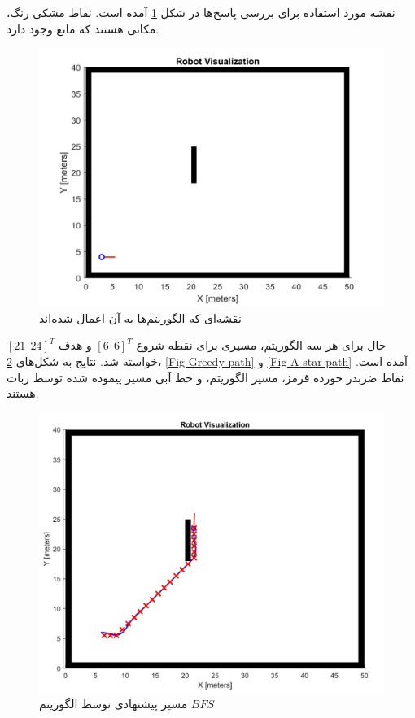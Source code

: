 نقشه مورد استفاده برای بررسی پاسخ‌ها در شکل \ref{Fig mapRooz} آمده است. نقاط مشکی رنگ، مکانی هستند که مانع وجود دارد.
\begin{figure}[!h]
	\centering
	\includegraphics[scale=0.35]{Images/mapRooz.jpg}
	\caption{نقشه‌ای که الگوریتم‌ها به آن اعمال شده‌اند}\label{Fig mapRooz}
\end{figure}

حال برای هر سه الگوریتم، مسیری برای نقطه شروع $[6~~6]^T$ و هدف $[21~~24]^T$ خواسته شد. نتایج به شکل‌های \ref{Fig BFS path}، \ref{Fig Greedy path} و \ref{Fig A-star path} آمده است. نقاط ضربدر خورده قرمز، مسیر الگوریتم، و خط آبی مسیر پیموده شده توسط ربات هستند.
\begin{figure}[!h]
	\centering
	\includegraphics[scale=0.35]{Images/BFS path.jpg}
	\caption{مسیر پیشنهادی توسط الگوریتم $BFS$}\label{Fig BFS path}
\end{figure}


